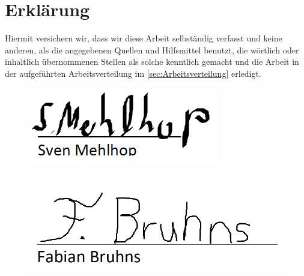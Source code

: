 \section{Erklärung}

Hiermit versichern wir, dass wir diese Arbeit selbständig verfasst und keine anderen, als die angegebenen Quellen und Hilfsmittel benutzt, die wörtlich oder inhaltlich übernommenen Stellen als solche kenntlich gemacht und die Arbeit in der aufgeführten Arbeitsverteilung im \autoref{sec:Arbeitsverteilung} erledigt. \\[2ex] 

\noindent
\begin{figure}[H]
	\includegraphics{Anhang/Unterschriften.png}
\end{figure}

\begin{figure}[H]
	\includegraphics{Anhang/UnterschriftFabian.png}
\end{figure}

